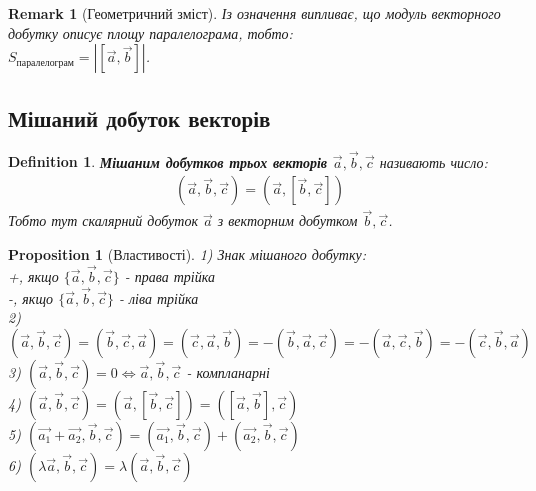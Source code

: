 \documentclass[a4paper, 10pt]{extarticle}
\theoremstyle{theoremdd}
\theoremstyle{theoremdd}
\newtheorem{definition}[theorem]{Definition}
\theoremstyle{theoremdd}
\theoremstyle{theoremdd}
\theoremstyle{theoremdd}
\newtheorem{proposition}[theorem]{Proposition}
\theoremstyle{theoremdd}
\newtheorem{remark}[theorem]{Remark}
\theoremstyle{theoremdd}
\theoremstyle{theoremdd}
\begin{document}
\begin{remark}[Геометричний зміст]
Із означення випливає, що модуль векторного добутку описує площу паралелограма, тобто:\\
$S_{\text{паралелограм}} = |[\vec{a},\vec{b}]|$.
\begin{figure}[H]
\centering
{}
\end{figure}
\end{remark}

\subsection{Мішаний добуток векторів}
\begin{definition}
\textbf{Мішаним добутков трьох векторів $\vec{a}, \vec{b}, \vec{c}$} називають число:
\begin{align*}
(\vec{a}, \vec{b}, \vec{c}) = (\vec{a}, [\vec{b}, \vec{c}])
\end{align*}
Тобто тут скалярний добуток $\vec{a}$ з векторним добутком $\vec{b},\vec{c}$.
\end{definition}

\begin{proposition}[Властивості]
1) Знак мішаного добутку:\\
+, якщо $\{\vec{a}, \vec{b}, \vec{c}\}$ - права трійка\\
-, якщо $\{\vec{a}, \vec{b}, \vec{c}\}$ - ліва трійка\\
2) $(\vec{a}, \vec{b}, \vec{c}) = (\vec{b}, \vec{c}, \vec{a}) = (\vec{c}, \vec{a}, \vec{b}) = -(\vec{b}, \vec{a}, \vec{c}) = -(\vec{a}, \vec{c}, \vec{b}) = -(\vec{c}, \vec{b}, \vec{a})$\\
3) $(\vec{a}, \vec{b}, \vec{c}) = 0 \iff \vec{a}, \vec{b}, \vec{c}$ - компланарні\\
4) $(\vec{a}, \vec{b}, \vec{c}) = (\vec{a}, [\vec{b}, \vec{c}]) = ([\vec{a},\vec{b}],\vec{c})$\\
5) $(\vec{a_1}+\vec{a_2}, \vec{b}, \vec{c}) = (\vec{a_1},\vec{b},\vec{c}) + (\vec{a_2},\vec{b},\vec{c})$\\
6) $(\lambda \vec{a}, \vec{b}, \vec{c}) = \lambda (\vec{a},\vec{b},\vec{c})$
\end{proposition}
\end{document}
